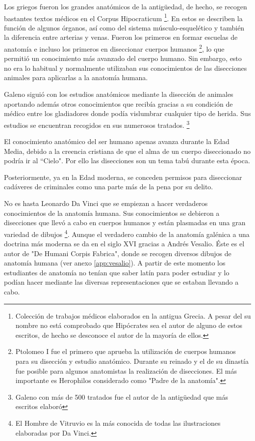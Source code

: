 Los griegos fueron los grandes anatómicos de la antigüedad, de hecho, se recogen bastantes textos médicos en el Corpus Hipocraticum \footnote{Colección de trabajos médicos elaborados en la antigua Grecia. A pesar del su nombre no está comprobado que Hipócrates sea el autor de alguno de estos escritos, de hecho se desconoce el autor de la mayoría de ellos.}. En estos se describen la función de algunos órganos, así como del sistema músculo-esquelético y también la diferencia entre arterias y venas. Fueron los primeros en formar escuelas de anatomía e incluso los primeros en diseccionar cuerpos humanos \footnote{Ptolomeo I fue el primero que aprueba la utilización de cuerpos humanos para su disección y estudio anatómico. Durante su reinado y el de su dinastía fue posible para algunos anatomistas la realización de disecciones. El más importante es Herophilos considerado como "Padre de la anatomía".}, lo que permitió un conocimiento más avanzado del cuerpo humano. Sin embargo, esto no era lo habitual y normalmente utilizaban sus conocimientos de las disecciones animales para aplicarlas a la anatomía humana.

Galeno siguió con los estudios anatómicos mediante la disección de animales aportando además otros conocimientos que recibía gracias a su condición de médico entre los gladiadores donde podía vislumbrar cualquier tipo de herida. Sus estudios se encuentran recogidos en sus numerosos tratados. \footnote{Galeno con más de 500 tratados fue el autor de la antigüedad que más escritos elaboró}

El conocimiento anatómico del ser humano apenas avanza durante la Edad Media, debido a la creencia cristiana de que el alma de un cuerpo diseccionado no podría ir al ``Cielo". Por ello las disecciones son un tema tabú durante esta época.

Posteriormente, ya en la Edad moderna, se conceden permisos para diseccionar cadáveres de criminales como una parte más de la pena por su delito.

No es hasta Leonardo Da Vinci que se empiezan a hacer verdaderos conocimientos de la anatomía humana. Sus conocimientos se debieron a disecciones que llevó a cabo en cuerpos humanos y están plasmadas en una gran variedad de dibujos \footnote{El Hombre de Vitruvio es la más conocida de todas las ilustraciones elaboradas por Da Vinci.}. Aunque el verdadero cambio de la anatomía galénica a una doctrina más moderna se da en el siglo XVI gracias a Andrés Vesalio. Éste es el autor de "De Humani Corpis Fabrica", donde se recogen diversos dibujos de anatomía humana (ver anexo \autoref{app:vesalio}). A partir de este momento los estudiantes de anatomía no tenían que saber latín para poder estudiar y lo podían hacer mediante las diversas representaciones que se estaban llevando a cabo.

